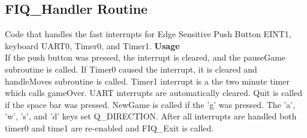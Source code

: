   \subsection{FIQ\_Handler Routine}
   \indent
	Code that handles the fast interrupts for Edge Sensitive Push Button EINT1, 
	keyboard UART0, Timer0, and Timer1.	
   \vskip 8pt
   \noindent
   {\bf Usage }\\
  	If the push button was pressed, the interrupt is cleared, and the pauseGame 
	subroutine is called. If Timer0 caused the interrupt, it is cleared and
	handleMoves subroutine is called. Timer1 interrupt is a the two minute timer
	which calls gameOver. UART interrupts are automatically cleared. Quit is called
 	if the space bar was pressed. NewGame is called if the 'g' was pressed. The 'a',
	'w', 's', and 'd' keys set Q\_DIRECTION. After all interrupts are handled both
	timer0 and time1 are re-enabled and FIQ\_Exit is called.    
 \vskip 8pt
  \noindent

